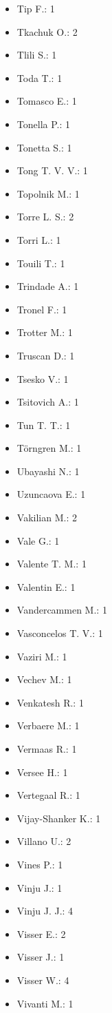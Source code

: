 \begin{itemize}
\item Tip F.: 1
\item Tkachuk O.: 2
\item Tlili S.: 1
\item Toda T.: 1
\item Tomasco E.: 1
\item Tonella P.: 1
\item Tonetta S.: 1
\item Tong T. V. V.: 1
\item Topolnik M.: 1
\item Torre L. S.: 2
\item Torri L.: 1
\item Touili T.: 1
\item Trindade A.: 1
\item Tronel F.: 1
\item Trotter M.: 1
\item Truscan D.: 1
\item Tsesko V.: 1
\item Tsitovich A.: 1
\item Tun T. T.: 1
\item Törngren M.: 1
\item Ubayashi N.: 1
\item Uzuncaova E.: 1
\item Vakilian M.: 2
\item Vale G.: 1
\item Valente T. M.: 1
\item Valentin E.: 1
\item Vandercammen M.: 1
\item Vasconcelos T. V.: 1
\item Vaziri M.: 1
\item Vechev M.: 1
\item Venkatesh R.: 1
\item Verbaere M.: 1
\item Vermaas R.: 1
\item Versee H.: 1
\item Vertegaal R.: 1
\item Vijay-Shanker K.: 1
\item Villano U.: 2
\item Vines P.: 1
\item Vinju J.: 1
\item Vinju J. J.: 4
\item Visser E.: 2
\item Visser J.: 1
\item Visser W.: 4
\item Vivanti M.: 1

\end{itemize}
